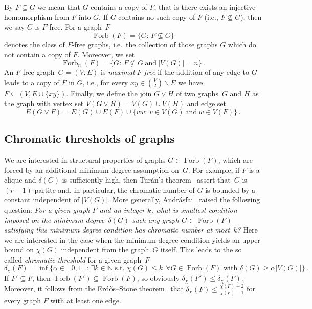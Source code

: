 \documentclass[reqno, 12pt]{amsart}
\theoremstyle{plain}
\theoremstyle{definition}
\let\setminus=\smallsetminus
\begin{document}
By $F\subseteq G$ we mean that $G$ contains a copy of $F$,
that is there exists an injective homomorphism from $F$ into $G$. If $G$ contains no such copy 
of $F$ (i.e., $F\nsubseteq G$), then we say $G$ is $F$-free.
For a graph~$F$ 
\[
	\operatorname{Forb}(F)=\{G{\colon\,} F \not\subseteq G\}
\]
denotes the class 
of $F$-free graphs, i.e.\
the collection of those graphs $G$ which do not contain a copy of $F$. Moreover, we set
\[
	\operatorname{Forb}_n(F)=\{G{\colon\,} F \not\subseteq G {\ \text{and}\ } |V(G)|=n\}\,.
\]
An $F$-free graph~$G=(V,E)$ 
is \emph{maximal $F$-free} if the addition of any edge to $G$ leads to a copy of $F$ in $G$, i.e.,
for every $xy\in \binom{V}{2}\setminus E$ we have $F\subseteq (V,E\cup\{xy\})$.
Finally, we define the join $G\vee H$ of two graphs~$G$ and $H$ as the graph with 
vertex set $V(G\vee H) = V(G)\cup V(H)$
and edge set
\[
	E(G\vee F) = E(G)\cup E(F) \cup \{vw{\colon\,} v\in V(G) {\ \text{and}\ } w\in V(F)\}\,. 
\]

\subsection{Chromatic thresholds of graphs}
We are interested in structural properties of graphs $G\in \operatorname{Forb}(F)$, 
which are forced by an additional minimum degree assumption on~$G$.
For example, if $F$ is a clique and $\delta(G)$ is sufficiently high, 
then Tur\'an's theorem~\cite{Tu41} assert that~$G$ is $(r-1)$-partite and, in particular,
the chromatic number of $G$ is bounded by a constant independent of $|V(G)|$.
More generally, Andr\'asfai~\cite{A62}
raised the following question:
\emph{For a given graph $F$ and an integer $k$, what is smallest condition imposed on the minimum degree~$\delta(G)$ 
such any graph $G\in\operatorname{Forb}(F)$ satisfying this minimum degree condition has chromatic number at most~$k$?}
Here we are interested in the case when the minimum degree condition yields an upper bound on $\chi(G)$
independent from the graph~$G$ itself. 
This leads to the so called \emph{chromatic threshold} for a given \mbox{graph $F$}
\[
	\delta_{\chi}(F) 
	= 
	\inf\big\{\alpha\in[0,1]{\colon\,} \exists k\in{\mathbb N} \text{ s.t.\ }
		\chi(G)\leq k \ \ \forall G\in \operatorname{Forb}(F)\text{ with }\delta(G)\geq \alpha |V(G)|\big\}\,.
\]
If $F'\subseteq F$, then $\operatorname{Forb}(F')\subseteq\operatorname{Forb}(F)$, so obviously $\delta_{\chi}(F') \leq \delta_{\chi}(F)$.
Moreover, it follows from the Erd\H os--Stone theorem~\cite{ErSt46} that 
$\delta_{\chi}(F)
	\leq 
	\frac{\chi(F)-2}{\chi(F)-1}$
for every graph $F$ with at least one edge.
\end{document}
